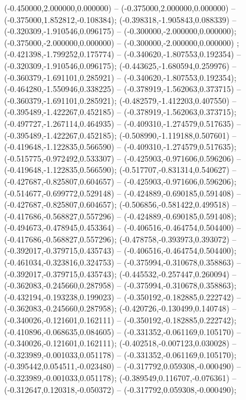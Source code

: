  (-0.450000,2.000000,0.000000) -- (-0.375000,2.000000,0.000000) -- (-0.375000,1.852812,-0.108384);
 (-0.398318,-1.905843,0.088339) -- (-0.320309,-1.910546,0.096175) -- (-0.300000,-2.000000,0.000000);
 (-0.375000,-2.000000,0.000000) -- (-0.300000,-2.000000,0.000000) ;
 (-0.421398,-1.799252,0.175774) -- (-0.340620,-1.807553,0.192354) -- (-0.320309,-1.910546,0.096175);
 (-0.443625,-1.680594,0.259976) -- (-0.360379,-1.691101,0.285921) -- (-0.340620,-1.807553,0.192354);
 (-0.464280,-1.550946,0.338225) -- (-0.378919,-1.562063,0.373715) -- (-0.360379,-1.691101,0.285921);
 (-0.482579,-1.412203,0.407550) -- (-0.395489,-1.422267,0.452185) -- (-0.378919,-1.562063,0.373715);
 (-0.497727,-1.267114,0.464935) -- (-0.409310,-1.274579,0.517635) -- (-0.395489,-1.422267,0.452185);
 (-0.508990,-1.119188,0.507601) -- (-0.419648,-1.122835,0.566590) -- (-0.409310,-1.274579,0.517635);
 (-0.515775,-0.972492,0.533307) -- (-0.425903,-0.971606,0.596206) -- (-0.419648,-1.122835,0.566590);
 (-0.517707,-0.831314,0.540627) -- (-0.427687,-0.825807,0.604657) -- (-0.425903,-0.971606,0.596206);
 (-0.514677,-0.699772,0.529148) -- (-0.424889,-0.690185,0.591408) -- (-0.427687,-0.825807,0.604657);
 (-0.506856,-0.581422,0.499518) -- (-0.417686,-0.568827,0.557296) -- (-0.424889,-0.690185,0.591408);
 (-0.494673,-0.478945,0.453364) -- (-0.406516,-0.464754,0.504400) -- (-0.417686,-0.568827,0.557296);
 (-0.478758,-0.393973,0.393072) -- (-0.392017,-0.379715,0.435743) -- (-0.406516,-0.464754,0.504400);
 (-0.461034,-0.323816,0.324753) -- (-0.375994,-0.310678,0.358863) -- (-0.392017,-0.379715,0.435743);
 (-0.445532,-0.257447,0.260094) -- (-0.362083,-0.245660,0.287958) -- (-0.375994,-0.310678,0.358863);
 (-0.432194,-0.193238,0.199023) -- (-0.350192,-0.182885,0.222742) -- (-0.362083,-0.245660,0.287958);
 (-0.420726,-0.130499,0.140748) -- (-0.340026,-0.121601,0.162111) -- (-0.350192,-0.182885,0.222742);
 (-0.410896,-0.068635,0.084605) -- (-0.331352,-0.061169,0.105170) -- (-0.340026,-0.121601,0.162111);
 (-0.402518,-0.007123,0.030028) -- (-0.323989,-0.001033,0.051178) -- (-0.331352,-0.061169,0.105170);
 (-0.395442,0.054511,-0.023480) -- (-0.317792,0.059308,-0.000490) -- (-0.323989,-0.001033,0.051178);
 (-0.389549,0.116707,-0.076361) -- (-0.312647,0.120318,-0.050372) -- (-0.317792,0.059308,-0.000490);
